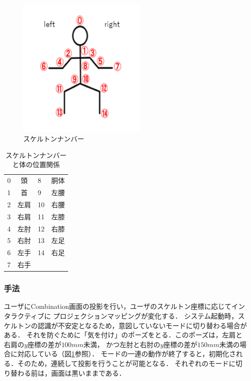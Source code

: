 \begin{figure}[htbp]
    \centering
    \includegraphics[height=7cm]{image/Skeleton_num.png}
    \caption{スケルトンナンバー}
  \label{num}
\end{figure}

\begin{table}[h]
    \centering
    \begin{tabular}{|lc|lc|} \hline
      0 & 頭 & 8 & 胴体 \\ 
      1 & 首 & 9 & 左腰 \\
      2 & 左肩 & 10 & 右腰 \\
      3 & 右肩 & 11 & 左膝 \\
      4 & 左肘 & 12 & 右膝 \\
      5 & 右肘 & 13 & 左足 \\
      6 & 左手 & 14 & 右足 \\
      7 & 右手 &  &  \\ \hline
    \end{tabular}
    \caption{スケルトンナンバーと体の位置関係}
    \label{num}
\end{table}

\clearpage
\subsubsection{手法}
ユーザにCombination画面の投影を行い，ユーザのスケルトン座標に応じてインタラクティブに
プロジェクションマッピングが変化する．
システム起動時，スケルトンの認識が不安定となるため，意図していないモードに切り替わる場合がある．
それを防ぐために「気を付け」のポーズをとる．このポーズは，左肩と右肩の$y$座標の差が$100mm$未満，
かつ左肘と右肘の$y$座標の差が$150mm$未満の場合に対応している（図\ref{num}参照）．
モードの一連の動作が終了すると，初期化される．そのため，連続して投影を行うことが可能となる．
それぞれのモードに切り替わる前は，画面は黒いままである．

